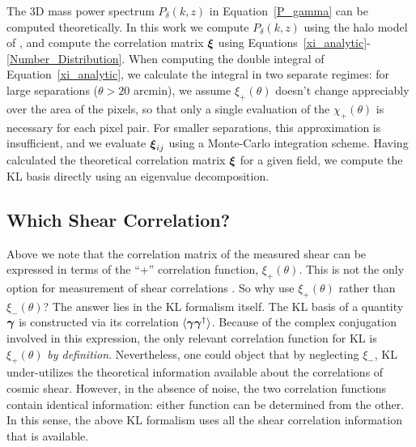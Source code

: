 The 3D mass power spectrum $P_\delta(k,z)$ in Equation~\ref{P_gamma}
can be computed theoretically.  
In this work we compute $P_\delta(k,z)$ using the halo model of 
\citet{Smith03}, and compute the correlation matrix $\boldsymbol{\xi}$ using 
Equations~\ref{xi_analytic}-\ref{Number_Distribution}.
When computing the double integral of Equation~\ref{xi_analytic},
we calculate the integral in two separate regimes:
for large separations ($\theta > 20$ arcmin), 
we assume $\xi_+(\theta)$ doesn't change appreciably over the area 
of the pixels, so that only a single evaluation of
the $\chi_+(\theta)$ is necessary for each pixel pair.  
For smaller separations, 
this approximation is insufficient, and we evaluate $\boldsymbol{\xi}_{ij}$ using
a Monte-Carlo integration scheme.  Having calculated the 
theoretical correlation matrix $\boldsymbol{\xi}$ for a given field, 
we compute the KL basis directly using an eigenvalue decomposition.

\subsection{Which Shear Correlation?}
\label{WhichCorrelation}
Above we note that the correlation matrix of the measured shear 
can be expressed
in terms of the ``+'' correlation function, $\xi_+(\theta)$.  This is not
the only option for measurement of shear correlations 
\citep[see, e.g.][]{Schneider02}.  So why use $\xi_+(\theta)$ rather 
than $\xi_-(\theta)$?  The answer lies in the KL formalism itself.  The KL
basis of a quantity $\boldsymbol{\gamma}$ is constructed via its correlation
$\langle\boldsymbol{\gamma} \boldsymbol{\gamma}^\dagger\rangle$.  Because of the complex
conjugation involved in this expression, the only relevant correlation 
function for KL is $\xi_+(\theta)$ \textit{by definition}.  Nevertheless,
one could object that by neglecting $\xi_-$, 
KL under-utilizes the theoretical information available 
about the correlations of cosmic shear. However, in the absence of noise, 
the two correlation functions contain identical information: 
either function can be determined from the other.  
In this sense, the above KL formalism
uses all the shear correlation information that is available.

